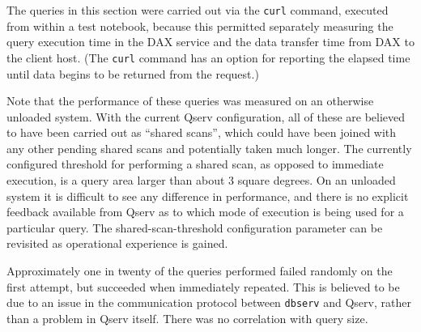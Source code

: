 The queries in this section were carried out via the \verb|curl| command, executed from within a test notebook,
because this permitted separately measuring the query execution time in the DAX service and the data transfer time from DAX to the client host.
(The \verb|curl| command has an option for reporting the elapsed time until data begins to be returned from the request.)

Note that the performance of these queries was measured on an otherwise unloaded system.
With the current Qserv configuration, all of these are believed to have been carried out as ``shared scans'',
which could have been joined with any other pending shared scans and potentially taken much longer.
The currently configured threshold for performing a shared scan,
as opposed to immediate execution, is a query area larger than about 3 square degrees.
On an unloaded system it is difficult to see any difference in performance,
and there is no explicit feedback available from Qserv as to which mode of execution is being used for a particular query.
The shared-scan-threshold configuration parameter can be revisited as operational experience is gained.

Approximately one in twenty of the queries performed failed randomly on the first attempt,
but succeeded when immediately repeated.
This is believed to be due to an issue in the communication protocol between \verb|dbserv| and Qserv,
rather than a problem in Qserv itself.
There was no correlation with query size.

